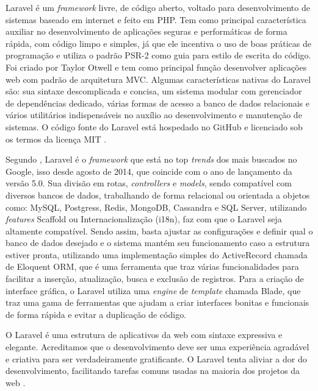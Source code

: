 Laravel é um \textit{framework} livre, de código aberto, voltado para desenvolvimento de sistemas baseado em internet e feito em PHP. Tem como principal característica auxiliar no desenvolvimento de aplicações seguras e performáticas de forma rápida, com código limpo e simples, já que ele incentiva o uso de boas práticas de programação e utiliza o padrão PSR-2 como guia para estilo de escrita do código. Foi criado por Taylor Otwell e tem como principal função desenvolver aplicações web com padrão de arquitetura MVC. Algumas características nativas do Laravel são: sua sintaxe descomplicada e concisa, um sistema modular com gerenciador de dependências dedicado, várias formas de acesso a banco de dados relacionais e vários utilitários indispensáveis no auxílio ao desenvolvimento e manutenção de sistemas. O código fonte do Laravel está hospedado no GitHub e licenciado sob os termos da licença MIT \cite{portalgsti:laravel}. 

Segundo , Laravel é o \textit{framework} que está no top \textit{trends} dos mais buscados no Google, isso desde agosto de 2014, que coincide com o ano de lançamento da versão 5.0. Sua divisão em rotas, \textit{controllers} e \textit{models}, sendo compatível com diversos bancos de dados, trabalhando de forma relacional ou orientada a objetos como: MySQL, Postgress, Redis, MongoDB, Cassandra e SQL Server, utilizando \textit{features} Scaffold ou Internacionalização (i18n), faz com que o Laravel seja altamente compatível. Sendo assim, basta ajustar as configurações e definir qual o banco de dados desejado e o sistema mantém seu funcionamento caso a estrutura estiver pronta, utilizando uma implementação simples do ActiveRecord chamada de Eloquent ORM, que é uma ferramenta que traz várias funcionalidades para facilitar a inserção, atualização, busca e exclusão de registros. Para a criação de interface gráfica, o Laravel utiliza uma \textit{engine} de \textit{template} chamada Blade, que traz uma gama de ferramentas que ajudam a criar interfaces bonitas e funcionais de forma rápida e evitar a duplicação de código.

\begin{citacao}
 O Laravel é uma estrutura de aplicativos da web com sintaxe expressiva e elegante. Acreditamos que o desenvolvimento deve ser uma experiência agradável e criativa para ser verdadeiramente gratificante. O Laravel tenta aliviar a dor do desenvolvimento, facilitando tarefas comuns usadas na maioria dos projetos da web \cite{laravel}.
\end{citacao}

